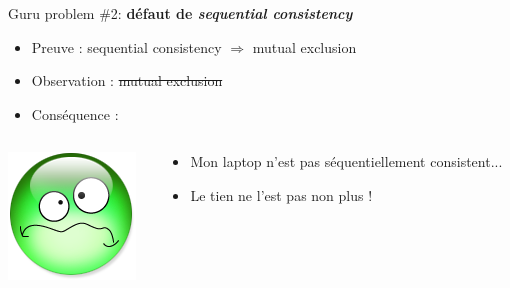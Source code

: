 \documentclass[xcolor={x11names,svgnames}]{beamer}
\begin{document}

\begin{frame}[label=peterson_report1, fragile]

  \begin{block}{Guru problem \#2: \bfseries défaut de \emph{sequential consistency}}

    \begin{itemize}
    \item Preuve : sequential consistency $\Rightarrow$ mutual exclusion
    \item Observation : \sout{mutual exclusion}
    \item Conséquence : 
    \end{itemize}
    
    \begin{columns}[c]
    \begin{column}{.1\textwidth}
      \includegraphics[width=\textwidth]{triste.png}
    \end{column}
    \begin{column}{.9\textwidth}
      \begin{itemize}
      \item Mon laptop n'est pas séquentiellement consistent...
        \pause
      \item Le tien ne l'est pas non plus !
      \end{itemize}
    \end{column}
  \end{columns}

\end{block}
\end{frame}
\end{document}
